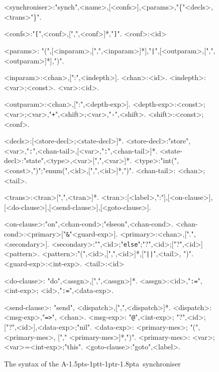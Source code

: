\documentclass[11pt]{report}
\def\ak{{\textsf{A\kern-1.5pts\kern-1ptt\kern-1ptr\kern-1.8pta}}\kern-2pt{\it K\kern-2ptahn}}
\begin{document}
\begin{figure}
\begin{framed}
\small
\begin{grammar}
<synchroniser>:"synch",<name>,[<confs>],<params>,"\{"<decls>,<trans>"\}".

<confs>:"{\tt [}",<conf>,[",",<conf>]*,"{\tt ]}".
<conf>:<id>

<params>: "(",[<inparam>,[",",<inparam>]*],"{\tt |}",[<outparam>,[",",<outparam>]*],")".

<inparam>:<chan>,[":",<indepth>].
<chan>:<id>.
<indepth>:<var>;<const>.
<var>:<id>.

<outparam>:<chan>,[":",<depth-exp>].
<depth-exp>:<const>;<var>;<var>,"{\tt+}",<shift>;<var>,"{\tt -}",<shift>.
<shift>:<const>;<conf>.

<decls>:[<store-decl>;<state-decl>]*.
<store-decl>:"store",<var>,"{\tt :}",<chan-tail>,[<var>,"{\tt :}",<chan-tail>]*.
<state-decl>:"state",<type>,<var>[",",<var>]*.
<type>:"int(",<const>,")";"enum(",<id>,[",",<id>]*,")".
<chan-tail>: <chan>;<tail>.

<trans>:<tran>[",",<tran>]*.
<tran>:[<label>,":"],[<on-clause>],[<do-clause>],[<send-clause>],[<goto-clause>].

<on-clause>:"on",<chan-cond>;"elseon",<chan-cond>.
<chan-cond>:<primary>["{\tt \&}"<guard-exp>].
<primary>:<chan>,[".",<secondary>].
<secondary>:"{\tt@}",<id>;"{\tt else}";"?",<id>;["?",<id>]<pattern>.
<pattern>:"(",<id>,[",",<id>]*,["{\tt||}",<tail>, ")".
<guard-exp>:<int-exp>.
<tail>:<id>

<do-clause>: "do",<assgn>,[",",<assgn>]*.
<assgn>:<id>,"{\tt :=}",<int-exp>; <id>,"{\tt :=}",<data-exp>.

<send-clause>: "send", <dispatch>,[",",<dispatch>]*.
<dispatch>: <msg-exp>,"{\tt =>}", <chan>.
<msg-exp>: "{\tt @}",<int-exp>; "?",<id>; ["?",<id>],<data-exp>;"nil".
<data-exp>: <primary-mes>; "(",<primary-mes>, ["," <primary-mes>]*,")".
<primary-mes>: <var>;<var>=<int-exp>;"this".
<goto-clause>:"goto",<label>.

\end{grammar}
\end{framed}
\caption{The syntax of the \ak\ synchroniser\label{synch-syntax}}
\end{figure}
\end{document}
